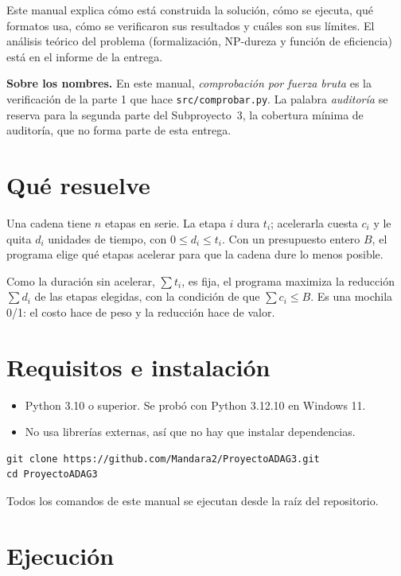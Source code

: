 \documentclass[11pt,a4paper]{article}
\newcommand{\cod}[1]{\texttt{#1}}
\begin{document}
Este manual explica cómo está construida la solución, cómo se ejecuta, qué formatos usa, cómo se verificaron sus resultados y cuáles son sus límites. El análisis teórico del problema (formalización, NP-dureza y función de eficiencia) está en el informe de la entrega.

\textbf{Sobre los nombres.} En este manual, \textit{comprobación por fuerza bruta} es la verificación de la parte 1 que hace \cod{src/comprobar.py}. La palabra \textit{auditoría} se reserva para la segunda parte del Subproyecto~3, la cobertura mínima de auditoría, que no forma parte de esta entrega.

\section{Qué resuelve}
\label{sec:que}

Una cadena tiene $n$ etapas en serie. La etapa $i$ dura $t_i$; acelerarla cuesta $c_i$ y le quita $d_i$ unidades de tiempo, con $0\le d_i\le t_i$. Con un presupuesto entero $B$, el programa elige qué etapas acelerar para que la cadena dure lo menos posible.

Como la duración sin acelerar, $\sum t_i$, es fija, el programa maximiza la reducción $\sum d_i$ de las etapas elegidas, con la condición de que $\sum c_i\le B$. Es una mochila 0/1: el costo hace de peso y la reducción hace de valor.

\section{Requisitos e instalación}

\begin{itemize}
  \item Python 3.10 o superior. Se probó con Python 3.12.10 en Windows 11.
  \item No usa librerías externas, así que no hay que instalar dependencias.
\end{itemize}

\begin{lstlisting}
git clone https://github.com/Mandara2/ProyectoADAG3.git
cd ProyectoADAG3
\end{lstlisting}

Todos los comandos de este manual se ejecutan desde la raíz del repositorio.

\section{Ejecución}
\label{sec:ejecucion}
\end{document}
